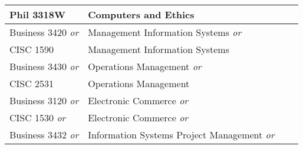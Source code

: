 \documentclass{article}
\begin{document}
\begin{Form}
\begin{longtable}{ |p{3.27cm}|p{6cm}|p{4.8cm}|p{2.3cm}|  }
		Phil 3318W               & Computers and Ethics                                       & \TextField[name=3318W_instructor,width=4.8cm,charsize=8pt,bordercolor=1 1 1,borderstyle=U]{} & \TextField[name=3318_grade,width=2.2cm,charsize=8pt,bordercolor=1 1 1]{{}}  \\
		\hline

		Business 3420 \emph{or}  & Management Information Systems \emph{or}                   & \TextField[name=3420_instructor,width=4.8cm,charsize=8pt,bordercolor=1 1 1,borderstyle=U]{}  & \TextField[name=3420_grade,width=2.2cm,charsize=8pt,bordercolor=1 1 1]{{}}  \\

		CISC 1590                & Management Information Systems                             & \TextField[name=1590_instructor,width=4.8cm,charsize=8pt,bordercolor=1 1 1,borderstyle=U]{}  & \TextField[name=1590_grade,width=2.2cm,charsize=8pt,bordercolor=1 1 1]{{}}  \\
		\hline
		Business 3430 \emph{or}  & Operations Management \emph{or}                            & \TextField[name=3430_instructor,width=4.8cm,charsize=8pt,bordercolor=1 1 1,borderstyle=U]{}  & \TextField[name=3430_grade,width=2.2cm,charsize=8pt,bordercolor=1 1 1]{{}}  \\

		CISC 2531                & Operations Management                                      & \TextField[name=2531_instructor,width=4.8cm,charsize=8pt,bordercolor=1 1 1,borderstyle=U]{}  & \TextField[name=2531_grade,width=2.2cm,charsize=8pt,bordercolor=1 1 1]{{}}  \\
		\hline

		Business 3120 \emph{or}  & Electronic Commerce \emph{or}                              & \TextField[name=3120_instructor,width=4.8cm,charsize=8pt,bordercolor=1 1 1,borderstyle=U]{}  & \TextField[name=3120_grade,width=2.2cm,charsize=8pt,bordercolor=1 1 1]{{}}  \\

		CISC 1530 \emph{or}      & Electronic Commerce \emph{or}                              & \TextField[name=1530_instructor,width=4.8cm,charsize=8pt,bordercolor=1 1 1,borderstyle=U]{}  & \TextField[name=1530_grade,width=2.2cm,charsize=8pt,bordercolor=1 1 1]{{}}  \\

		Business 3432 \emph{or}  & Information Systems Project Management \emph{or}           & \TextField[name=3432_instructor,width=4.8cm,charsize=8pt,bordercolor=1 1 1,borderstyle=U]{}  & \TextField[name=3432_grade,width=2.2cm,charsize=8pt,bordercolor=1 1 1]{{}}  \\


\end{longtable}
\end{Form}
\end{document}
